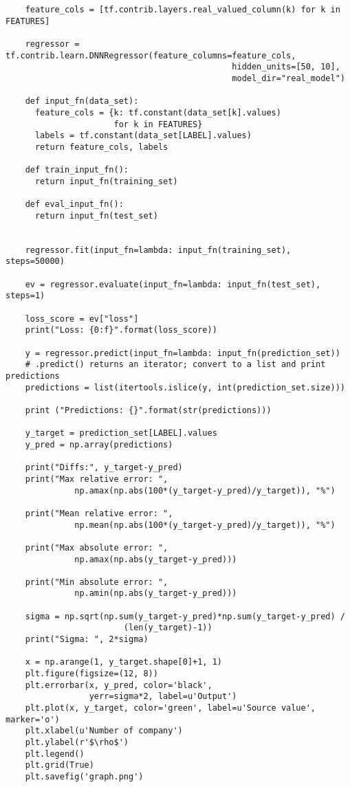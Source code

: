 \begin{lstlisting}
    feature_cols = [tf.contrib.layers.real_valued_column(k) for k in FEATURES]
    
    regressor = tf.contrib.learn.DNNRegressor(feature_columns=feature_cols,
                                              hidden_units=[50, 10],
                                              model_dir="real_model")
    
    def input_fn(data_set):
      feature_cols = {k: tf.constant(data_set[k].values)
                      for k in FEATURES}
      labels = tf.constant(data_set[LABEL].values)
      return feature_cols, labels
    
    def train_input_fn():
      return input_fn(training_set)
    
    def eval_input_fn():
      return input_fn(test_set)
    
    
    regressor.fit(input_fn=lambda: input_fn(training_set), steps=50000)
    
    ev = regressor.evaluate(input_fn=lambda: input_fn(test_set), steps=1)
    
    loss_score = ev["loss"]
    print("Loss: {0:f}".format(loss_score))
    
    y = regressor.predict(input_fn=lambda: input_fn(prediction_set))
    # .predict() returns an iterator; convert to a list and print predictions
    predictions = list(itertools.islice(y, int(prediction_set.size)))
    
    print ("Predictions: {}".format(str(predictions)))
    
    y_target = prediction_set[LABEL].values
    y_pred = np.array(predictions)
    
    print("Diffs:", y_target-y_pred)
    print("Max relative error: ",
              np.amax(np.abs(100*(y_target-y_pred)/y_target)), "%")
    
    print("Mean relative error: ",
              np.mean(np.abs(100*(y_target-y_pred)/y_target)), "%")
    
    print("Max absolute error: ",
              np.amax(np.abs(y_target-y_pred)))
    
    print("Min absolute error: ",
              np.amin(np.abs(y_target-y_pred)))
    
    sigma = np.sqrt(np.sum(y_target-y_pred)*np.sum(y_target-y_pred) /
                        (len(y_target)-1))
    print("Sigma: ", 2*sigma)
    
    x = np.arange(1, y_target.shape[0]+1, 1)
    plt.figure(figsize=(12, 8))
    plt.errorbar(x, y_pred, color='black',
                 yerr=sigma*2, label=u'Output')
    plt.plot(x, y_target, color='green', label=u'Source value', marker='o')
    plt.xlabel(u'Number of company')
    plt.ylabel(r'$\rho$')
    plt.legend()
    plt.grid(True)
    plt.savefig('graph.png')

\end{lstlisting}